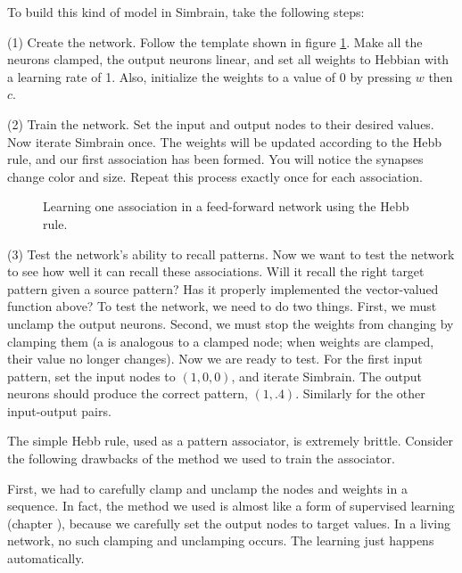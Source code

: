 To build this kind of model in Simbrain, take the following steps:

(1) Create the network. Follow the template shown in figure \ref{ffAssociator}. Make all the neurons clamped, the output neurons linear, and set all weights to Hebbian with a learning rate of 1. Also, initialize the weights to a value of 0 by pressing $w$ then $c$. 

(2) Train the network. Set the input and output nodes to their desired values. Now iterate Simbrain once. The weights will be updated according to the Hebb rule, and our first association has been formed. You will notice the synapses change color and size. Repeat this process exactly once for each association.

\begin{figure}[h]
\centering
{}
\caption[Simbrain screenshot.]{Learning one association in a feed-forward network using the Hebb rule.}
\label{ffAssociator}
\end{figure}

(3) Test the network's ability to recall patterns.  Now we want to test the network to see how well it can recall these associations. Will it recall the right target pattern given a source pattern? Has it properly implemented the vector-valued function above?  To test the network, we need to do two things. First, we must unclamp the output neurons. Second, we must stop the weights from changing by clamping them (a  is analogous to a clamped node; when weights are clamped, their value no longer changes). Now we are ready to test. For the first input pattern, set the input nodes to $(1,0,0)$, and iterate Simbrain. The output neurons should produce the correct pattern, $(1, .4)$. Similarly for the other input-output pairs.

The simple Hebb rule, used as a pattern associator, is extremely brittle. Consider the following drawbacks of the method we used to train the associator.

First, we had to carefully clamp and unclamp the nodes and weights in a sequence. In fact, the method we used is almost like a form of supervised learning (chapter ), because we carefully set the output nodes to target values. In a living network, no such clamping and unclamping occurs. The learning just happens automatically. 


